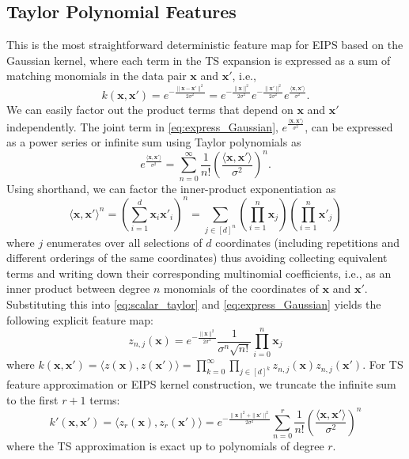 \documentclass[8pt,twocolumn]{IEEEtran}
\newcommand{\x}{\mathbf{x}}
\newcommand{\inner}[1]{\langle {#1} \rangle}
\begin{document}
\subsection{Taylor Polynomial Features}\label{sec:taylor_features}
This is the most straightforward deterministic feature map for EIPS based on the Gaussian kernel, where each term in the TS expansion is expressed as a sum of matching monomials in the data pair $\mathbf{x}$ and $\mathbf{x}'$, i.e.,
\begin{equation}\label{eq:express_Gaussian}
k(\mathbf{x}, \mathbf{x}') = e^{-\frac{\|\mathbf{x}- \mathbf{x}'\|^2}{2\sigma^2}} =
e^{-\frac{\|\mathbf{x}\|^2}{2\sigma^2}}e^{-\frac{\|\mathbf{x}'\|^2}{2\sigma^2}}e^{\frac{\langle \mathbf{x}, \mathbf{x}'\rangle}{\sigma^2}}.
\end{equation}
We can easily factor out the product terms that depend on $\x$ and $\x'$ independently. The joint term in \eqref{eq:express_Gaussian}, $e^{\frac{\langle \mathbf{x}, \mathbf{x}'\rangle}{\sigma^2}}$, can be expressed as a power series or infinite sum using Taylor polynomials as
\begin{equation}\label{eq:scalar_taylor}
e^{\frac{\inner{\x,\x'}}{\sigma^2}} = \sum_{n=0}^{\infty}
\frac{1}{n!}\left(\frac{\inner{\x,\x'}}{\sigma^2}\right)^n.
\end{equation}
Using shorthand, we can factor the inner-product exponentiation as
\begin{equation}\label{eq:multinomial_exp}
\inner{\x,\x'}^n=\left(\sum_{i=1}^d \x_i \x'_i\right)^n=\sum_{j \in [d]^n} \left(
\prod_{i=1}^n \x_{j} \right) \left( \prod_{i=1}^n \x'_{j} \right)
\end{equation}
where $j$ enumerates over all selections of $d$ coordinates (including repetitions and different orderings of the same coordinates) thus avoiding collecting equivalent terms and writing down their corresponding multinomial coefficients, i.e., as an inner product between degree $n$ monomials of the coordinates of $\x$ and $\x'$. Substituting this into \eqref{eq:scalar_taylor} and \eqref{eq:express_Gaussian} yields the following explicit feature map:
\begin{equation}
\label{eq:taylor_features} z_{n,j}\left( \x \right) =
e^{-\frac{\|\x\|^2}{2\sigma^2}} \frac{1}{\sigma^{n}\sqrt{n!}}\prod_{i=0}^{n}
{\x}_{j}
\end{equation}
where $k(\x,\x') = \inner{z(\x),z(\x')} = \prod_{k=0}^{\infty} \prod_{j\in [d]^k} z_{n,j}(\x)z_{n,j}(\x')$. For TS feature approximation or EIPS kernel construction, we truncate the infinite sum to the first $r+1$ terms:
\begin{equation}
\label{eq:taylor_kernel_expansion} k'(\x,\x')=\inner{z_r(\x),z_r(\x')}
= e^{-\frac{\|\x\|^2+\|\x'\|^2}{2\sigma^2}} \sum_{n=0}^{r} \frac{1}{n!}\left(\frac{\inner{\x,\x'}}{\sigma^2}\right)^n
\end{equation}
where the TS approximation is exact up to polynomials of degree $r$.
\end{document}
